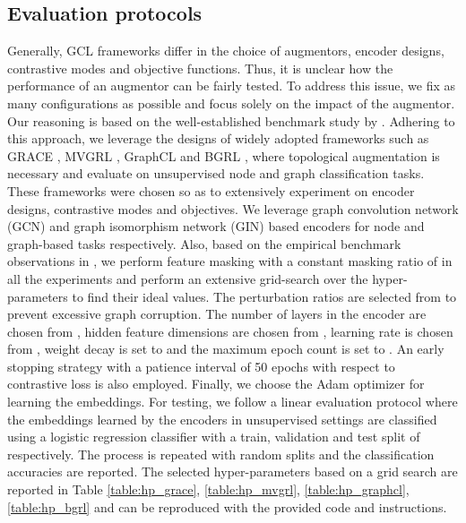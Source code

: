 \documentclass{article}
\theoremstyle{plain}
\theoremstyle{definition}
\theoremstyle{remark}
\begin{document}
\subsection{Evaluation protocols}

Generally, GCL frameworks differ in the choice of augmentors, encoder designs, contrastive modes and objective functions. Thus, it is unclear how the performance of an augmentor can be fairly tested. To address this issue, we fix as many configurations as possible and focus solely on the impact of the augmentor. Our reasoning is based on the well-established benchmark study by \citet{zhu2021empirical}. Adhering to this approach, we leverage the designs of widely adopted frameworks such as GRACE \citep{zhu2020deep}, MVGRL \citep{hassani2020contrastive}, GraphCL \citep{you2020graph} and BGRL \citep{thakoor2021bootstrapped}, where topological augmentation is necessary and evaluate on unsupervised node and graph classification tasks. These frameworks were chosen so as to extensively experiment on encoder designs, contrastive modes and objectives. We leverage graph convolution network (GCN) \citep{kipf2016semi} and graph isomorphism network (GIN) \cite{xu2018powerful} based encoders for node and graph-based tasks respectively. Also, based on the empirical benchmark observations in \citet{zhu2021empirical}, we perform feature masking with a constant masking ratio of  in all the experiments and perform an extensive grid-search over the hyper-parameters to find their ideal values. The perturbation ratios  are selected from  to prevent excessive graph corruption. The number of layers in the encoder are chosen from , hidden feature dimensions are chosen from , learning rate is chosen from , weight decay is set to  and the maximum epoch count is set to . An early stopping strategy with a patience interval of 50 epochs with respect to contrastive loss is also employed. Finally, we choose the Adam optimizer for learning the embeddings. For testing, we follow a linear evaluation protocol \citep{velickovic2019deep, zhu2021empirical} where the embeddings learned by the encoders in unsupervised settings are classified using a logistic regression classifier with a train, validation and test split of  respectively. The process is repeated with  random splits and the classification accuracies are reported. The selected hyper-parameters based on a grid search are reported in Table \ref{table:hp_grace}, \ref{table:hp_mvgrl}, \ref{table:hp_graphcl}, \ref{table:hp_bgrl} and can be reproduced with the provided code and instructions.
\end{document}
